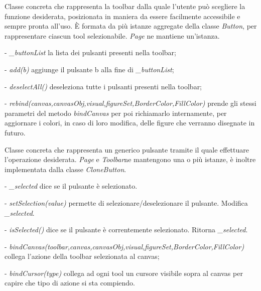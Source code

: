 Classe concreta che rappresenta la toolbar dalla quale l'utente pu\` o scegliere la funzione desiderata, posizionata in maniera da essere facilmente accessibile e sempre pronta all'uso.
\` E formata da pi\`u istanze aggregate della classe \textit{Button}, per rappresentare ciascun tool selezionabile. 
\textit{Page} ne mantiene un'istanza.
\begin{elencopuntato}[\subsubsecindent]
\item[-] \textit{{\_}buttonList} la lista dei pulsanti presenti nella toolbar;
\end{elencopuntato}
\begin{elencopuntato}[\subsubsecindent]
\item[-]  \textit{add(b)} aggiunge il pulsante b alla fine di \textit{{\_}buttonList};
\item[-] \textit{deselectAll()} deseleziona tutte i pulsanti presenti nella toolbar;
\item[-] \textit{rebind(canvas,canvasObj,visual,figureSet,BorderColor,FillColor)} prende gli stessi parametri del metodo \textit{bindCanvas} per poi richiamarlo internamente, per aggiornare i colori, in caso di loro modifica, delle figure che verranno disegnate in futuro.
\end{elencopuntato}

Classe concreta che rappresenta un generico pulsante tramite il quale effettuare l'operazione desiderata.
\textit{Page} e \textit{Toolbar}ne mantengono una o pi\` u istanze, \` e inoltre implementata dalla classe \textit{CloneButton}.
\begin{elencopuntato}[\subsubsecindent]
\item[-] \textit{{\_}selected} dice se il pulsante \`e selezionato.
\end{elencopuntato}
\begin{elencopuntato}[\subsubsecindent]
\item[-]  \textit{setSelection(value)} permette di selezionare/deselezionare il pulsante. Modifica \textit{{\_}selected}.
\item[-]  \textit{isSelected()} dice se il pulsante \`e correntemente selezionato. Ritorna \textit{{\_}selected}.
\item[-]  \textit{bindCanvas(toolbar,canvas,canvasObj,visual,figureSet,BorderColor,FillColor)} collega l'azione della toolbar selezionata al canvas;
\item[-]  \textit{bindCursor(type)} collega ad ogni tool un cursore visibile sopra al canvas per capire che tipo di azione si sta compiendo.
\end{elencopuntato}


